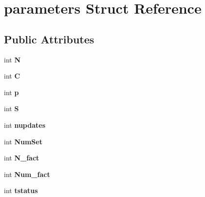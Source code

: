 \hypertarget{structparameters}{}\section{parameters Struct Reference}
\label{structparameters}
\subsection*{Public Attributes}
\begin{DoxyCompactItemize}
\item 
\hypertarget{structparameters_a0b2132a2da84d48e4575f6d9e8e899ee}{}int {\bfseries N}\label{structparameters_a0b2132a2da84d48e4575f6d9e8e899ee}

\item 
\hypertarget{structparameters_a2143fd1bb0b1132240b2ac1f48797837}{}int {\bfseries C}\label{structparameters_a2143fd1bb0b1132240b2ac1f48797837}

\item 
\hypertarget{structparameters_a83fbd6f42d209aab6d3aa8360835cb55}{}int {\bfseries p}\label{structparameters_a83fbd6f42d209aab6d3aa8360835cb55}

\item 
\hypertarget{structparameters_a491bc36fe07cd5249f7d54fd82f7cb63}{}int {\bfseries S}\label{structparameters_a491bc36fe07cd5249f7d54fd82f7cb63}

\item 
\hypertarget{structparameters_adaa744c06c33db9f1116ddd62bf97303}{}int {\bfseries nupdates}\label{structparameters_adaa744c06c33db9f1116ddd62bf97303}

\item 
\hypertarget{structparameters_a7308970e43d375353d1fccc1e581a8f4}{}int {\bfseries Num\+Set}\label{structparameters_a7308970e43d375353d1fccc1e581a8f4}

\item 
\hypertarget{structparameters_a3fd36b05da1943711146096ac4528c92}{}int {\bfseries N\+\_\+fact}\label{structparameters_a3fd36b05da1943711146096ac4528c92}

\item 
\hypertarget{structparameters_a9d567a9e2b598ee9fbe8ac4ecd611bb4}{}int {\bfseries Num\+\_\+fact}\label{structparameters_a9d567a9e2b598ee9fbe8ac4ecd611bb4}

\item 
\hypertarget{structparameters_ab1a47a209b6cbeea981c2001aa48a603}{}int {\bfseries tstatus}\label{structparameters_ab1a47a209b6cbeea981c2001aa48a603}


\end{DoxyCompactItemize}
